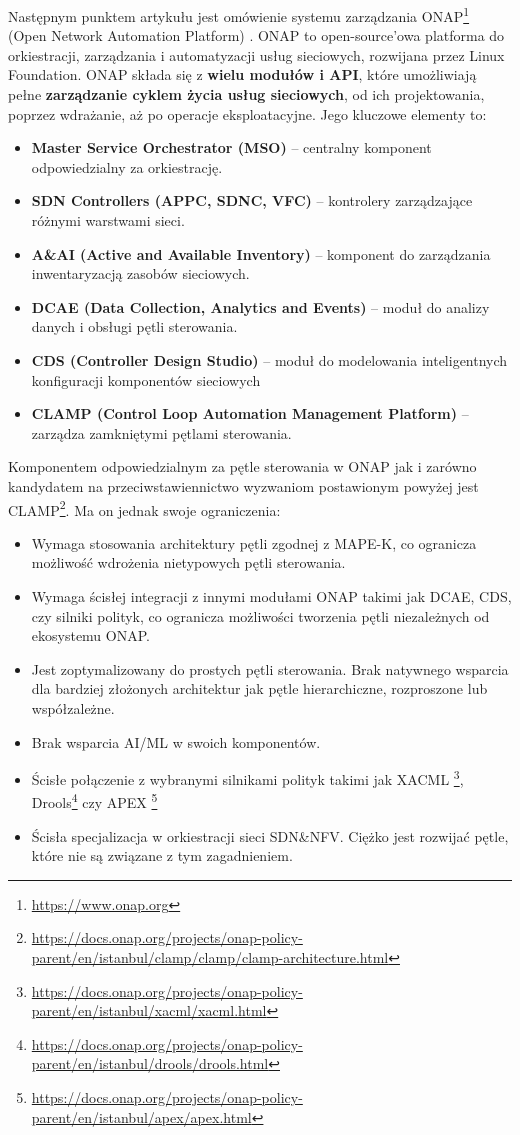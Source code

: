 Następnym punktem artykułu jest omówienie systemu zarządzania ONAP\footnote{\url{https://www.onap.org}} (Open Network Automation Platform) \cite{onap2018}. ONAP to open-source’owa platforma do orkiestracji, zarządzania i automatyzacji usług sieciowych, rozwijana przez Linux Foundation. ONAP składa się z \textbf{wielu modułów i API}, które umożliwiają pełne \textbf{zarządzanie cyklem życia usług sieciowych}, od ich projektowania, poprzez wdrażanie, aż po operacje eksploatacyjne. Jego kluczowe elementy to:
\begin{itemize}
    \item \textbf{Master Service Orchestrator (MSO)} – centralny komponent odpowiedzialny za orkiestrację.
    \item \textbf{SDN Controllers (APPC, SDNC, VFC)} – kontrolery zarządzające różnymi warstwami sieci.
    \item \textbf{A\&AI (Active and Available Inventory)} – komponent do zarządzania inwentaryzacją zasobów sieciowych.
    \item \textbf{DCAE (Data Collection, Analytics and Events)} – moduł do analizy danych i obsługi pętli sterowania.
    \item \textbf{CDS (Controller Design Studio)} – moduł do modelowania inteligentnych konfiguracji komponentów sieciowych
    \item \textbf{CLAMP (Control Loop Automation Management Platform)} – zarządza zamkniętymi pętlami sterowania.
\end{itemize}

Komponentem odpowiedzialnym za pętle sterowania w ONAP jak i zarówno kandydatem na przeciwstawiennictwo wyzwaniom postawionym powyżej jest CLAMP\footnote{\url{https://docs.onap.org/projects/onap-policy-parent/en/istanbul/clamp/clamp/clamp-architecture.html}}. Ma on jednak swoje ograniczenia:
\begin{itemize}
    \item Wymaga stosowania architektury pętli zgodnej z MAPE-K, co ogranicza możliwość wdrożenia nietypowych pętli sterowania.
    \item Wymaga ścisłej integracji z innymi modułami ONAP takimi jak DCAE, CDS, czy silniki polityk, co ogranicza możliwości tworzenia pętli niezależnych od ekosystemu ONAP.
    \item Jest zoptymalizowany do prostych pętli sterowania. Brak natywnego wsparcia dla bardziej złożonych architektur jak pętle hierarchiczne, rozproszone lub współzależne.
    \item Brak wsparcia AI/ML w swoich komponentów.
    \item Ścisłe połączenie z wybranymi silnikami polityk takimi jak XACML \footnote{\url{https://docs.onap.org/projects/onap-policy-parent/en/istanbul/xacml/xacml.html}}, Drools\footnote{\url{https://docs.onap.org/projects/onap-policy-parent/en/istanbul/drools/drools.html}} czy APEX \footnote{\url{https://docs.onap.org/projects/onap-policy-parent/en/istanbul/apex/apex.html}} 
    \item Ścisła specjalizacja w orkiestracji sieci SDN\&NFV. Ciężko jest rozwijać pętle, które nie są związane z tym zagadnieniem.
\end{itemize}


